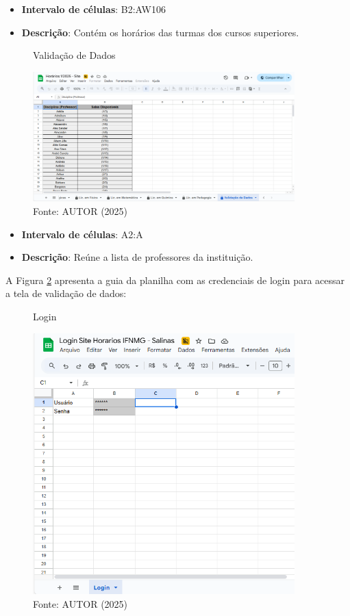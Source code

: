 \begin{itemize}
    \item \textbf{Intervalo de células}: B2:AW106
    \item \textbf{Descrição}: Contém os horários das turmas dos cursos superiores.
\end{itemize}

\begin{figure}[htb]
    \centering
    \caption{Validação de Dados}
    \includegraphics[width=0.9\textwidth]{Figuras/plan-3.png}
    \caption*{Fonte: AUTOR (2025)}
    \label{fig_plan_3}
\end{figure}

\begin{itemize}
    \item \textbf{Intervalo de células}: A2:A
    \item \textbf{Descrição}: Reúne a lista de professores da instituição.
\end{itemize}

A Figura \ref{fig_plan_4} apresenta a guia da planilha com as credenciais de login para acessar a tela de validação de dados:

\begin{figure}[htb]
    \centering
    \caption{Login}
    \includegraphics[width=0.9\textwidth]{Figuras/plan-4.png}
    \caption*{Fonte: AUTOR (2025)}
    \label{fig_plan_4}
\end{figure}

